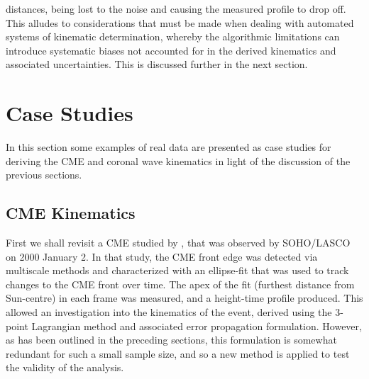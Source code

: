 \documentclass[structabstract]{aa}
\begin{document}
distances, being lost to the noise and causing the measured profile to drop off. This alludes to considerations that must be made when dealing with automated systems of kinematic determination, whereby the algorithmic limitations can introduce systematic biases not accounted for in the derived kinematics and associated uncertainties. This is discussed further in the next section.




\section{Case Studies}
\label{sect:case_studies}

In this section some examples of real data are presented as case studies for deriving the CME and coronal wave kinematics in light of the discussion of the previous sections. %

\subsection{CME Kinematics}
\label{subsect:corimp}


First we shall revisit a CME studied by \citet{2009A&A...495..325B}, that was observed by SOHO/LASCO on 2000 January 2. In that study, the CME front edge was detected via multiscale methods and characterized with an ellipse-fit that was used to track changes to the CME front over time. The apex of the fit (furthest distance from Sun-centre) in each frame was measured, and a height-time profile produced. This allowed an investigation into the kinematics of the event, derived using the 3-point Lagrangian method and associated error propagation formulation. However, as has been outlined in the preceding sections, this formulation is somewhat redundant for such a small sample size, and so a new method is applied to test the validity of the analysis.
\end{document}
